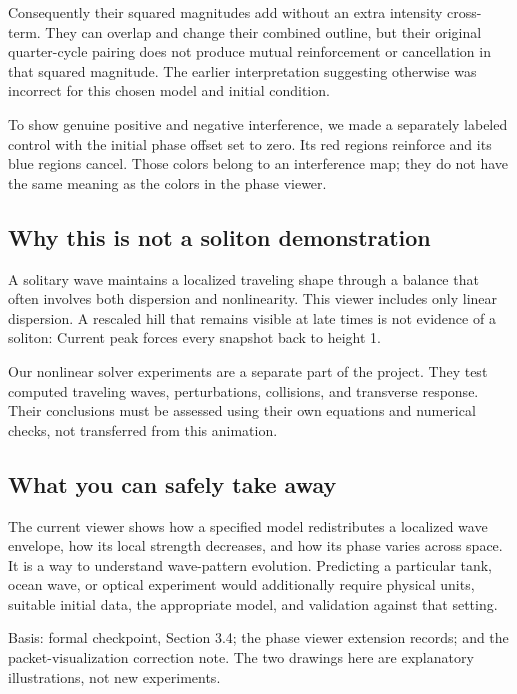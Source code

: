 \documentclass[10pt]{article}
\begin{document}
Consequently their squared magnitudes add without an extra intensity cross-term. They can overlap and change their combined outline, but their original quarter-cycle pairing does not produce mutual reinforcement or cancellation in that squared magnitude. The earlier interpretation suggesting otherwise was incorrect for this chosen model and initial condition.

To show genuine positive and negative interference, we made a separately labeled control with the initial phase offset set to zero. Its red regions reinforce and its blue regions cancel. Those colors belong to an interference map; they do not have the same meaning as the colors in the phase viewer.

\subsection{Why this is not a soliton demonstration}

A solitary wave maintains a localized traveling shape through a balance that often involves both dispersion and nonlinearity. This viewer includes only linear dispersion. A rescaled hill that remains visible at late times is not evidence of a soliton: Current peak forces every snapshot back to height 1.

Our nonlinear solver experiments are a separate part of the project. They test computed traveling waves, perturbations, collisions, and transverse response. Their conclusions must be assessed using their own equations and numerical checks, not transferred from this animation.

\subsection{What you can safely take away}

The current viewer shows how a specified model redistributes a localized wave envelope, how its local strength decreases, and how its phase varies across space. It is a way to understand wave-pattern evolution. Predicting a particular tank, ocean wave, or optical experiment would additionally require physical units, suitable initial data, the appropriate model, and validation against that setting.

Basis: formal checkpoint, Section 3.4; the phase viewer extension records; and the packet-visualization correction note. The two drawings here are explanatory illustrations, not new experiments.
\end{document}
